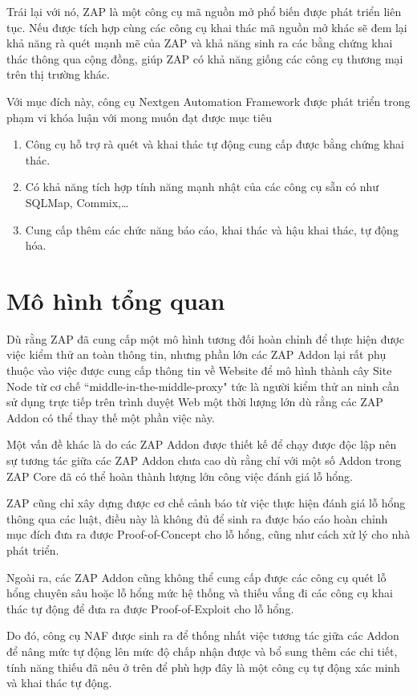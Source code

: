 \documentclass[./../main.tex]{subfiles}
\begin{document}
Trái lại với nó, ZAP là một công cụ mã nguồn mở phổ biến được phát triển liên tục. Nếu được tích hợp cùng các công cụ khai thác mã nguồn mở khác sẽ đem lại khả năng rà quét mạnh mẽ của ZAP và khả năng sinh ra các bằng chứng khai thác thông qua cộng đồng, giúp ZAP có khả năng giống các công cụ thương mại trên thị trường khác.

Với mục đích này, công cụ Nextgen Automation Framework được phát triển trong phạm vi khóa luận với mong muốn đạt được mục tiêu
\begin{enumerate}
	\item Công cụ hỗ trợ rà quét và khai thác tự động cung cấp được bằng chứng khai thác.
	\item Có khả năng tích hợp tính năng mạnh nhật của các công cụ sẵn có như SQLMap, Commix,\ldots
	\item Cung cấp thêm các chức năng báo cáo, khai thác và hậu khai thác, tự động hóa.
\end{enumerate}

\section{Mô hình tổng quan}

Dù rằng ZAP đã cung cấp một mô hình tương đối hoàn chỉnh để thực hiện được
việc kiểm thử an toàn thông tin, nhưng phần lớn các ZAP Addon lại rất
phụ thuộc vào việc được cung cấp thông tin về Website để mô hình thành
cây Site Node từ cơ chế “middle-in-the-middle-proxy" tức là người kiểm
thử an ninh cần sử dụng trực tiếp trên trình duyệt Web một thời lượng lớn
dù rằng các ZAP Addon có thể thay thế một phần việc này.

Một vấn đề khác là do các ZAP Addon được thiết kế để chạy được độc lập
nên sự tương tác giữa các ZAP Addon chưa cao dù rằng chỉ với một số Addon
trong ZAP Core đã có thể hoàn thành lượng lớn công việc đánh giá lỗ hổng.

ZAP cũng chỉ xây dựng được cơ chế cảnh báo từ việc thực hiện đánh giá
lỗ hổng thông qua các luật, điều này là không đủ để sinh ra được báo
cáo hoàn chỉnh mục đích đưa ra được Proof-of-Concept cho lỗ hổng, cũng
như cách xử lý cho nhà phát triển.

Ngoài ra, các ZAP Addon cũng không thể cung cấp được các công cụ quét
lỗ hổng chuyên sâu hoặc lỗ hổng mức hệ thống và thiếu vắng đi các công
cụ khai thác tự động để đưa ra được Proof-of-Exploit cho lỗ hổng.

Do đó, công cụ NAF được sinh ra để thống nhất việc tương tác giữa các
Addon để nâng mức tự động lên mức độ chấp nhận được và bổ sung thêm
các chi tiết, tính năng thiếu đã nêu ở trên để phù hợp đây là một công
cụ tự động xác minh và khai thác tự động.
\end{document}
